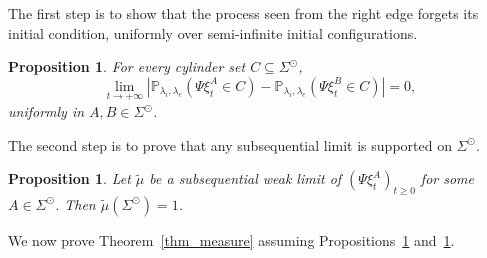 \documentclass[11pt,a4paper]{article}
\theoremstyle{plain}
\newtheorem{proposition}[theorem]{Proposition}
\theoremstyle{definition}
\theoremstyle{remark}
\numberwithin{equation}{section}
\begin{document}
	The first step is to show that the process seen from the right edge forgets its initial condition, uniformly over semi-infinite initial configurations.
	
	\begin{proposition} \label{prop_uniquenessmeasure}
		For every cylinder set $C\subseteq\Sigma^{\odot}$,
		\begin{equation*}
			\lim_{t\to+\infty}
			\left|
			\mathbb{P}_{\lambda_i,\lambda_e}(\Psi\xi_t^A\in C)
			-
			\mathbb{P}_{\lambda_i,\lambda_e}(\Psi\xi_t^B\in C)
			\right|=0,
		\end{equation*}
		uniformly in $A,B\in\Sigma^{\odot}$.
	\end{proposition}
	
	The second step is to prove that any subsequential limit is supported on $\Sigma^{\odot}$.
	
	\begin{proposition}\label{prop_fullmeasure}
		Let $\tilde{\mu}$ be a subsequential weak limit of $(\Psi\xi_t^A)_{t\geq0}$ for some $A\in\Sigma^{\odot}$. Then $\tilde{\mu}(\Sigma^{\odot})=1$.
	\end{proposition}
	
	We now prove Theorem~\ref{thm_measure} assuming Propositions~\ref{prop_uniquenessmeasure} and~\ref{prop_fullmeasure}.
	
\end{document}
